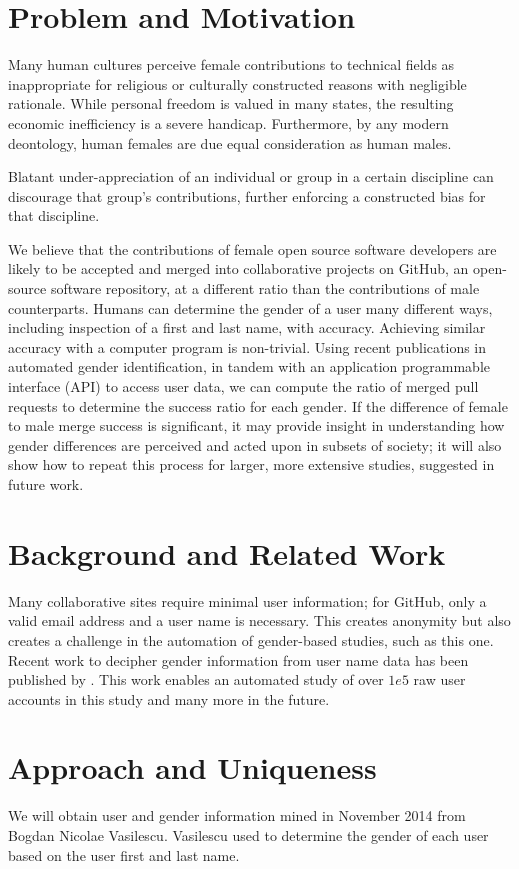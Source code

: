 \documentclass{sigplanconf}
\begin{document}
\section{Problem and Motivation}
Many human cultures perceive female contributions to technical
fields as inappropriate for religious or culturally constructed reasons with
negligible rationale. While personal freedom is valued in many states, the
resulting economic inefficiency is a severe handicap. Furthermore, by any modern
deontology, human females are due equal consideration as human males.

Blatant under-appreciation of an individual or group in a certain
discipline can discourage that group's contributions, further enforcing a
constructed bias for that discipline.

We believe that the contributions of female open source software developers are
likely to be accepted and merged into collaborative projects on GitHub, an
open-source software repository, at a different ratio than the contributions
of male counterparts. Humans can determine the gender of a user many different
ways, including inspection of a first and last name, with accuracy. Achieving
similar accuracy with a computer program is non-trivial. Using recent publications in automated gender
identification, in tandem with an application programmable interface (API) to
access user data, we can compute the ratio of merged pull requests to
determine the success ratio for each gender. If the difference of female to male merge success is
significant, it may provide insight in understanding how gender differences are
perceived and acted upon in subsets of
society; it will also show how to repeat this process for larger, more extensive
studies, suggested in future work.

\section{Background and Related Work}
Many collaborative sites require minimal user information; for GitHub, only a valid email
address and a user name is necessary. This creates anonymity but also creates a
challenge in the automation of gender-based studies, such
as this one. Recent work to decipher gender information from user name data has been
published by \cite{hemphill2014feminism}. This work enables an automated study
of over $1e5$ raw user accounts in this study and many more in the future.

\section{Approach and Uniqueness}
We will obtain user and gender information mined in November 2014 from Bogdan
Nicolae Vasilescu. Vasilescu used \cite{hemphill2014feminism} to determine the
gender of each user based on the user first and last name.
\end{document}
